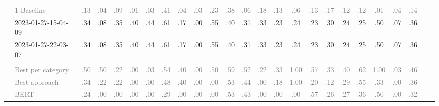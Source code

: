 \begin{table*}
\begin{tabular}{@{}ll@{\hspace{10pt}}c@{\hspace{5pt}}cccccccccccccccccccccc@{}}
& \textcolor{gray}{1-Baseline} & \textcolor{gray}{.13} & \textcolor{gray}{.04} & \textcolor{gray}{.09} & \textcolor{gray}{.01} & \textcolor{gray}{.03} & \textcolor{gray}{.41} & \textcolor{gray}{.04} & \textcolor{gray}{.03} & \textcolor{gray}{.23} & \textcolor{gray}{.38} & \textcolor{gray}{.06} & \textcolor{gray}{.18} & \textcolor{gray}{.13} & \textcolor{gray}{.06} & \textcolor{gray}{.13} & \textcolor{gray}{.17} & \textcolor{gray}{.12} & \textcolor{gray}{.12} & \textcolor{gray}{.01} & \textcolor{gray}{.04} & \textcolor{gray}{.14} \\
& 2023-01-27-15-04-09 & .34 & .08 & .35 & .40 & .44 & .61 & .17 & .00 & .55 & .40 & .31 & .33 & .23 & .24 & .23 & .30 & .24 & .25 & .50 & .07 & .36 \\
& 2023-01-27-22-03-07 & .34 & .08 & .35 & .40 & .44 & .61 & .17 & .00 & .55 & .40 & .31 & .33 & .23 & .24 & .23 & .30 & .24 & .25 & .50 & .07 & .36 \\
\addlinespace
\multicolumn{2}{@{}l}{\emph{New York Times}} \\
& \textcolor{gray}{Best per category} & \textcolor{gray}{.50} & \textcolor{gray}{.50} & \textcolor{gray}{.22} & \textcolor{gray}{.00} & \textcolor{gray}{.03} & \textcolor{gray}{.54} & \textcolor{gray}{.40} & \textcolor{gray}{.00} & \textcolor{gray}{.50} & \textcolor{gray}{.59} & \textcolor{gray}{.52} & \textcolor{gray}{.22} & \textcolor{gray}{.33} & \textcolor{gray}{1.00} & \textcolor{gray}{.57} & \textcolor{gray}{.33} & \textcolor{gray}{.40} & \textcolor{gray}{.62} & \textcolor{gray}{1.00} & \textcolor{gray}{.03} & \textcolor{gray}{.46} \\
& \textcolor{gray}{Best approach} & \textcolor{gray}{.34} & \textcolor{gray}{.22} & \textcolor{gray}{.22} & \textcolor{gray}{.00} & \textcolor{gray}{.00} & \textcolor{gray}{.48} & \textcolor{gray}{.40} & \textcolor{gray}{.00} & \textcolor{gray}{.00} & \textcolor{gray}{.53} & \textcolor{gray}{.44} & \textcolor{gray}{.00} & \textcolor{gray}{.18} & \textcolor{gray}{1.00} & \textcolor{gray}{.20} & \textcolor{gray}{.12} & \textcolor{gray}{.29} & \textcolor{gray}{.55} & \textcolor{gray}{.33} & \textcolor{gray}{.00} & \textcolor{gray}{.36} \\
& \textcolor{gray}{BERT} & \textcolor{gray}{.24} & \textcolor{gray}{.00} & \textcolor{gray}{.00} & \textcolor{gray}{.00} & \textcolor{gray}{.00} & \textcolor{gray}{.29} & \textcolor{gray}{.00} & \textcolor{gray}{.00} & \textcolor{gray}{.00} & \textcolor{gray}{.53} & \textcolor{gray}{.43} & \textcolor{gray}{.00} & \textcolor{gray}{.00} & \textcolor{gray}{.00} & \textcolor{gray}{.57} & \textcolor{gray}{.26} & \textcolor{gray}{.27} & \textcolor{gray}{.36} & \textcolor{gray}{.50} & \textcolor{gray}{.00} & \textcolor{gray}{.32} \\

\end{tabular}
\end{table*}
